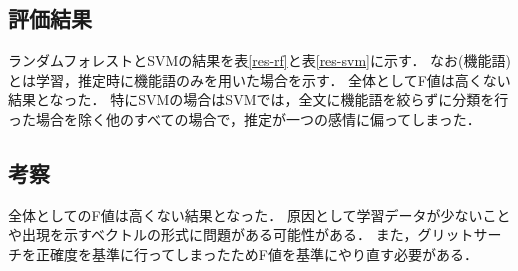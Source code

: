 \subsection{評価結果}
\begin{table}[ht]
 \centering
  \caption{ランダムフォレストでの結果}
  \vspace{0.3\baselineskip}
  \label{res-rf}
\end{table}

\begin{table}[ht]
 \centering
  \caption{SVMでの結果}
  \vspace{0.3\baselineskip}
  \label{res-svm}
\end{table}

ランダムフォレストとSVMの結果を表\ref{res-rf}と表\ref{res-svm}に示す．
なお(機能語)とは学習，推定時に機能語のみを用いた場合を示す．
全体としてF値は高くない結果となった．
特にSVMの場合はSVMでは，全文に機能語を絞らずに分類を行った場合を除く他のすべての場合で，推定が一つの感情に偏ってしまった．

\subsection{考察}
全体としてのF値は高くない結果となった．
原因として学習データが少ないことや出現を示すベクトルの形式に問題がある可能性がある．
また，グリットサーチを正確度を基準に行ってしまったためF値を基準にやり直す必要がある．

